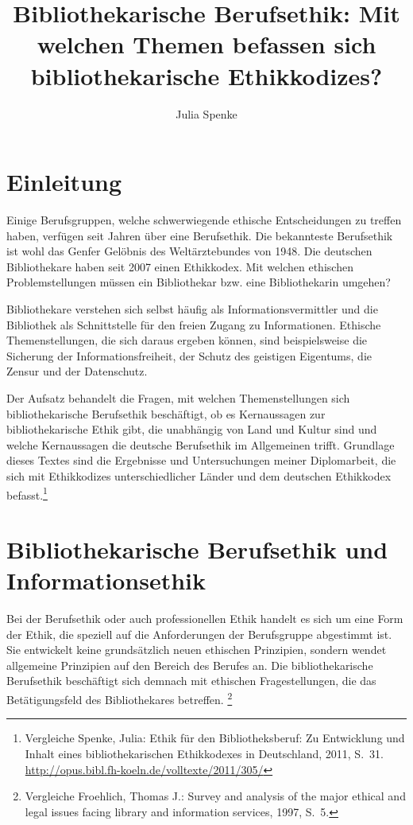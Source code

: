 \documentclass[output=paper]{langscibook}
\title{Bibliothekarische Berufsethik: Mit welchen Themen befassen sich bibliothekarische Ethikkodizes?}
\author{Julia Spenke}
\begin{document}
\maketitle

\hypertarget{einleitung}{%
\section*{Einleitung}\label{einleitung}}

Einige Berufsgruppen, welche schwerwiegende ethische Entscheidungen zu
treffen haben, verfügen seit Jahren über eine Berufsethik. Die
bekannteste Berufsethik ist wohl das Genfer Gelöbnis des Weltärztebundes
von 1948. Die deutschen Bibliothekare haben seit 2007 einen Ethikkodex.
Mit welchen ethischen Problemstellungen müssen ein Bibliothekar bzw.
eine Bibliothekarin umgehen?

Bibliothekare verstehen sich selbst häufig als Informationsvermittler
und die Bibliothek als Schnittstelle für den freien Zugang zu
Informationen. Ethische Themenstellungen, die sich daraus ergeben
können, sind beispielsweise die Sicherung der Informationsfreiheit, der
Schutz des geistigen Eigentums, die Zensur und der Datenschutz.

Der Aufsatz behandelt die Fragen, mit welchen Themenstellungen sich
bibliothekarische Berufsethik beschäftigt, ob es Kernaussagen zur
bibliothekarische Ethik gibt, die unabhängig von Land und Kultur sind
und welche Kernaussagen die deutsche Berufsethik im Allgemeinen trifft.
Grundlage dieses Textes sind die Ergebnisse und Untersuchungen meiner
Diplomarbeit, die sich mit Ethikkodizes unterschiedlicher Länder und dem
deutschen Ethikkodex befasst.\footnote{Vergleiche Spenke, Julia: Ethik für den
  Bibliotheksberuf: Zu Entwicklung und Inhalt eines bibliothekarischen
  Ethikkodexes in Deutschland, 2011, S.~31.
  \url{http://opus.bibl.fh-koeln.de/volltexte/2011/305/}}

\hypertarget{bibliothekarische-berufsethik-und-informationsethik}{%
\section*{Bibliothekarische Berufsethik und
Informationsethik}\label{bibliothekarische-berufsethik-und-informationsethik}}

Bei der Berufsethik oder auch professionellen Ethik handelt es sich um
eine Form der Ethik, die speziell auf die Anforderungen der Berufsgruppe
abgestimmt ist. Sie entwickelt keine grundsätzlich neuen ethischen
Prinzipien, sondern wendet allgemeine Prinzipien auf den Bereich des
Berufes an. Die bibliothekarische Berufsethik beschäftigt sich demnach
mit ethischen Fragestellungen, die das Betätigungsfeld des
Bibliothekares betreffen. \footnote{Vergleiche Froehlich, Thomas J.: Survey
  and analysis of the major ethical and legal issues facing library and
  information services, 1997, S.~5.}
\end{document}
